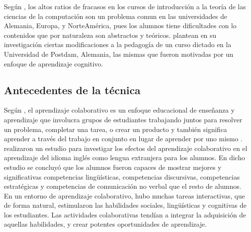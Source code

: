 
Según , los altos ratios de fracasos en los cursos de introducción a la teoría de las ciencias de la computación son un problema comun en las universidades de Alemania, Europa, y NorteAmérica, pues los alumnos tiene dificultades con lo contenidos que por naturaleza son abstractos y teóricos. \cite{knobelsdorf_teaching_2014} plantean en su investigación ciertas modificaciones a la pedagogía de un curso dictado en la Universidad de Postdam, Alemania, las mismas que fueron motivadas por un enfoque de aprendizaje cognitivo.

\subsection{Antecedentes de la técnica}

Según \cite{laal_collaborative_2012}, el aprendizaje colaborativo es un enfoque educacional de enseñanza y aprendizaje que involucra grupos de estudiantes trabajando juntos para resolver un problema, completar una tarea, o crear un producto y también significa aprender a través del trabajo en conjunto en lugar de aprender por uno mismo \cite{barkley_collaborative_2012}.\\


 realizaron un estudio para investigar los efectos del aprendizaje colaborativo en el aprendizaje del idioma inglés como lengua extranjera para los alumnos. En dicho estudio se concluyó que los alumnos fueron capaces de mostrar mejores y significativas competencias lingüísticas, competencias discursivas, competencias estratégicas y competencias de comunicación no verbal que el resto de alumnos. En un entorno de aprendizaje colaborativo, hubo muchas tareas interactivas, que de forma natural, estimularon las habilidades sociales, lingüísticas y cognitivas de los estudiantes. Las actividades colaborativas tendían a integrar la adquisición de aquellas habilidades, y crear potentes oportunidades de aprendizaje.\\

